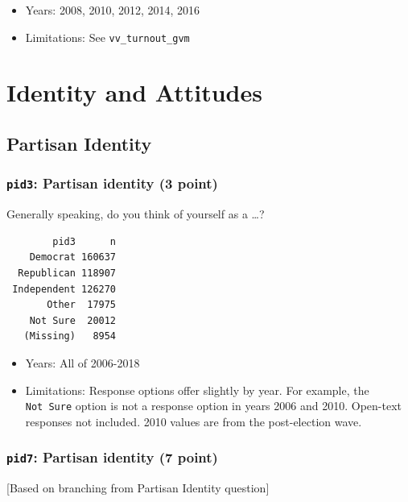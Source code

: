 \documentclass[10pt,article,oneside]{memoir}
\theoremstyle{definition}
\begin{document}
\begin{itemize}
\tightlist
\item
  Years: 2008, 2010, 2012, 2014, 2016
\item
  Limitations: See \texttt{vv\_turnout\_gvm}
\end{itemize}

\newpage

\section{Identity and Attitudes}\label{identity-and-attitudes}

\subsection{Partisan Identity}\label{partisan-identity}

\subsubsection{\texorpdfstring{\texttt{pid3}: Partisan identity (3
point)}{pid3: Partisan identity (3 point)}}\label{pid3-partisan-identity-3-point}

Generally speaking, do you think of yourself as a \ldots{}?

\begin{verbatim}
        pid3      n
    Democrat 160637
  Republican 118907
 Independent 126270
       Other  17975
    Not Sure  20012
   (Missing)   8954
\end{verbatim}

\begin{itemize}
\tightlist
\item
  Years: All of 2006-2018
\item
  Limitations: Response options offer slightly by year. For example, the
  \texttt{Not\ Sure} option is not a response option in years 2006 and
  2010. Open-text responses not included. 2010 values are from the
  post-election wave.
\end{itemize}

\subsubsection{\texorpdfstring{\texttt{pid7}: Partisan identity (7
point)}{pid7: Partisan identity (7 point)}}\label{pid7-partisan-identity-7-point}

{[}Based on branching from Partisan Identity question{]}
\end{document}
